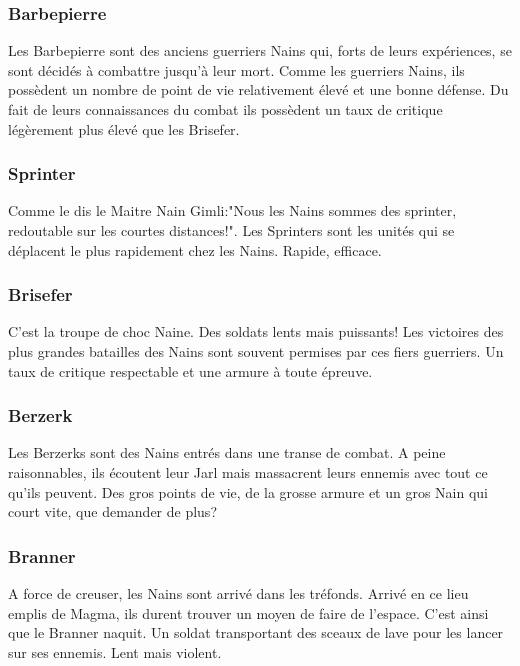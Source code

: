 \documentclass[a4paper]{article}
\begin{document}
	\subsubsection{Barbepierre}
	
	\quad Les Barbepierre sont des anciens guerriers Nains qui, forts de leurs expériences, se sont décidés à combattre jusqu'à leur mort. Comme les guerriers Nains, ils possèdent un nombre de point de vie relativement élevé et une bonne défense. Du fait de leurs connaissances du combat ils possèdent un taux de critique légèrement plus élevé que les Brisefer.

	\subsubsection{Sprinter}
	
	\quad Comme le dis le Maitre Nain Gimli:"Nous les Nains sommes des sprinter, redoutable sur les courtes distances!". Les Sprinters sont les unités qui se déplacent le plus rapidement chez les Nains. Rapide, efficace.

	\subsubsection{Brisefer}

	\quad C'est la troupe de choc Naine. Des soldats lents mais puissants! Les victoires des plus grandes batailles des Nains sont souvent permises par ces fiers guerriers. Un taux de critique respectable et une armure à toute épreuve.

	\subsubsection{Berzerk}
	
	\quad Les Berzerks sont des Nains entrés dans une transe de combat. A peine raisonnables, ils écoutent leur Jarl mais massacrent leurs ennemis avec tout ce qu'ils peuvent. Des gros points de vie, de la grosse armure et un gros Nain qui court vite, que demander de plus?

	\subsubsection{Branner}
	
	\quad A force de creuser, les Nains sont arrivé dans les tréfonds. Arrivé en ce lieu emplis de Magma, ils durent trouver un moyen de faire de l'espace. C'est ainsi que le Branner naquit. Un soldat transportant des sceaux de lave pour les lancer sur ses ennemis. Lent mais violent.
\end{document}
